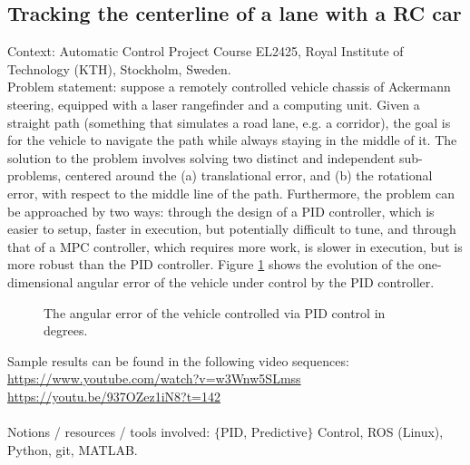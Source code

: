 \subsection{Tracking the centerline of a lane with a RC car}

Context: Automatic Control Project Course EL2425, Royal Institute of
Technology (KTH), Stockholm, Sweden.\\

Problem statement: suppose a remotely controlled vehicle chassis of Ackermann
steering, equipped with a laser rangefinder and a computing unit. Given a
straight path (something that simulates a road lane, e.g. a corridor), the goal
is for the vehicle to navigate the path while always staying in the middle of it.
The solution to the problem involves solving two distinct and independent
sub-problems, centered around the (a) translational error, and (b) the
rotational error, with respect to the middle line of the path. Furthermore, the
problem can be approached by two ways: through the design of a PID controller,
which is easier to setup, faster in execution, but potentially difficult to tune,
and through that of a MPC controller, which requires more work, is slower in
execution, but is more robust than the PID controller. Figure
\ref{fig:centerline_pid_error} shows the evolution of the one-dimensional
angular error of the vehicle under control by the PID controller.

\begin{figure}[H]\centering
  \scalebox{0.6}{}
  \caption{The angular error of the vehicle controlled via PID control in degrees.}
  \label{fig:centerline_pid_error}
\end{figure}

\noindent Sample results can be found in the following video sequences:\\
\url{https://www.youtube.com/watch?v=w3Wnw5SLmss}\\
\url{https://youtu.be/937OZez1iN8?t=142}\\\\
Notions / resources / tools involved: $\{$PID, Predictive$\}$ Control, ROS (Linux), Python, git, MATLAB.
